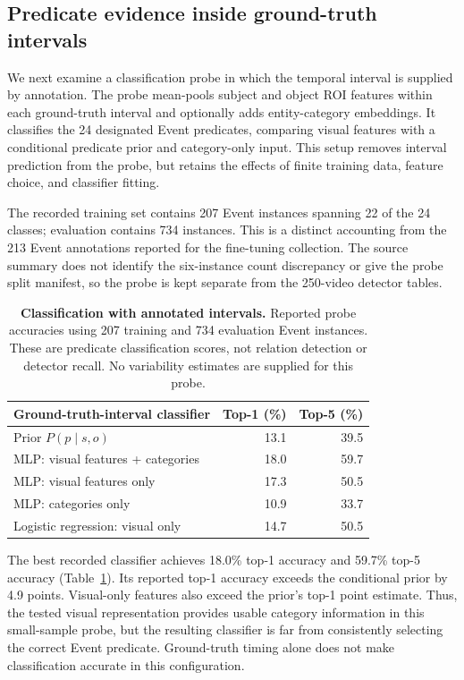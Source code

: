 \documentclass[10pt,twocolumn,letterpaper]{article}
\begin{document}
\subsection{Predicate evidence inside ground-truth intervals}
We next examine a classification probe in which the temporal interval is supplied by annotation. The probe mean-pools subject and object ROI features within each ground-truth interval and optionally adds entity-category embeddings. It classifies the 24 designated Event predicates, comparing visual features with a conditional predicate prior and category-only input. This setup removes interval prediction from the probe, but retains the effects of finite training data, feature choice, and classifier fitting.

The recorded training set contains 207 Event instances spanning 22 of the 24 classes; evaluation contains 734 instances. This is a distinct accounting from the 213 Event annotations reported for the fine-tuning collection. The source summary does not identify the six-instance count discrepancy or give the probe split manifest, so the probe is kept separate from the 250-video detector tables.

\begin{table}[t]
\centering\small
\setlength{\tabcolsep}{5pt}
\begin{tabular}{lrr}
\toprule
Ground-truth-interval classifier & Top-1 (\%) & Top-5 (\%)\\
\midrule
Prior $P(p\mid s,o)$ & 13.1 & 39.5\\
MLP: visual features + categories & 18.0 & 59.7\\
MLP: visual features only & 17.3 & 50.5\\
MLP: categories only & 10.9 & 33.7\\
Logistic regression: visual only & 14.7 & 50.5\\
\bottomrule
\end{tabular}
\caption{\textbf{Classification with annotated intervals.} Reported probe accuracies using 207 training and 734 evaluation Event instances. These are predicate classification scores, not relation detection or detector recall. No variability estimates are supplied for this probe.}
\label{tab:probe}
\end{table}

The best recorded classifier achieves 18.0\% top-1 accuracy and 59.7\% top-5 accuracy (Table~\ref{tab:probe}). Its reported top-1 accuracy exceeds the conditional prior by 4.9 points. Visual-only features also exceed the prior's top-1 point estimate. Thus, the tested visual representation provides usable category information in this small-sample probe, but the resulting classifier is far from consistently selecting the correct Event predicate. Ground-truth timing alone does not make classification accurate in this configuration.
\end{document}
